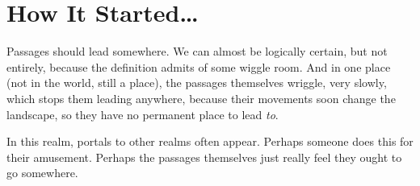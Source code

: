 \chapter[How It Started]{How It Started\ldots}

\begin{center}
\begin{minipage}{0.7\linewidth}
Passages should lead somewhere.
We can almost be logically certain, but not entirely, because the definition admits of some wiggle room.
And in one place (not in the world, still a place), the passages themselves wriggle, very slowly, which stops them leading anywhere, because their movements soon change the landscape, so they have no permanent place to lead \emph{to}.

In this realm, portals to other realms often appear.
Perhaps someone does this for their amusement.
Perhaps the passages themselves just really feel they ought to go somewhere.

\bigLine
\end{minipage}

\end{center}
\vspace{1em}

